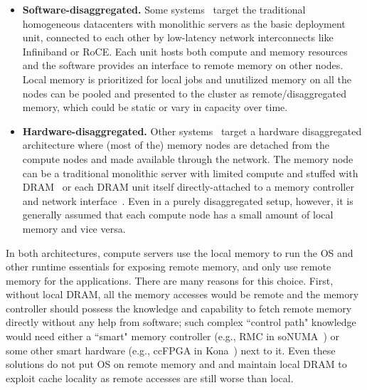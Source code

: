 \begin{itemize}
    \item \textbf{Software-disaggregated.}
    Some systems~\cite{gms,cashmere,infiniswap,remregions,
    leap,zswap} target the traditional homogeneous 
    datacenters with monolithic servers as the basic 
    deployment unit, connected to each other by low-latency 
    network interconnects like Infiniband or RoCE. Each 
    unit hosts both compute and memory resources and the 
    software provides an interface to remote memory 
    on other nodes. Local memory is prioritized for 
    local jobs and unutilized memory on all the nodes 
    can be pooled and presented to the cluster as 
    remote/disaggregated memory, which could be static 
    or vary in capacity over time. 

    \item \textbf{Hardware-disaggregated.}
    Other systems~\cite{kona,aifm,fastswap,semeru,legoos} 
    target a hardware disaggregated architecture where (most 
    of the) memory nodes are detached from the compute nodes 
    and made available through the network. The memory node 
    can be a traditional monolithic server with limited 
    compute and stuffed with DRAM~\cite{fastswap} or 
    each DRAM unit itself directly-attached to a memory 
    controller and network interface~\cite{legoos}. 
    Even in a purely disaggregated setup, however, 
    it is generally assumed that each compute node has 
    a small amount of local memory and vice 
    versa.~\cite{legoos,kona}
\end{itemize}

In both architectures, compute servers use the local memory 
to run the OS and other runtime essentials for exposing remote 
memory, and only use remote memory for the applications. 
There are many reasons for this choice. 
First, without local DRAM, all the memory 
accesses would be remote and the memory controller should 
possess the knowledge and capability to fetch remote memory 
directly without any help from software; such complex ``control 
path" knowledge would need either a ``smart" memory controller 
(e.g., RMC in soNUMA~\cite{sonuma}) or some other smart 
hardware (e.g., ccFPGA in Kona~\cite{kona}) next to it. 
Even these solutions do not put OS on remote memory and 
and maintain local DRAM to exploit cache locality as remote 
accesses are still worse than local.

